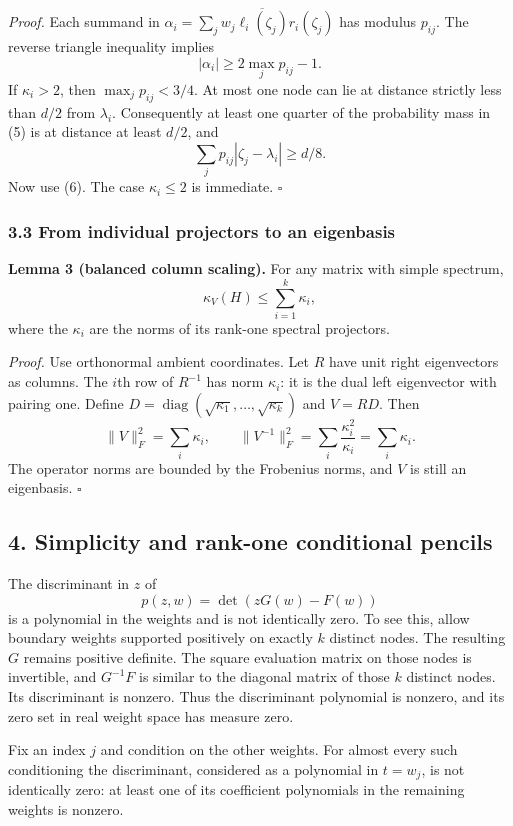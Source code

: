 \documentclass[
  11pt,
]{article}
\begin{document}
\emph{Proof.} Each summand in
\(\alpha_i=\sum_jw_j\overline{\ell_i(\zeta_j)}r_i(\zeta_j)\) has modulus
\(p_{ij}\). The reverse triangle inequality implies \[
|\alpha_i|\geq2\max_jp_{ij}-1.
\] If \(\kappa_i>2\), then \(\max_jp_{ij}<3/4\). At most one node can
lie at distance strictly less than \(d/2\) from \(\lambda_i\).
Consequently at least one quarter of the probability mass in (5) is at
distance at least \(d/2\), and \[
\sum_jp_{ij}|\zeta_j-\lambda_i|\geq d/8.
\] Now use (6). The case \(\kappa_i\leq2\) is immediate. \(\square\)

\subsubsection{3.3 From individual projectors to an
eigenbasis}\label{from-individual-projectors-to-an-eigenbasis}

\textbf{Lemma 3 (balanced column scaling).} For any matrix with simple
spectrum, \[
\kappa_V(H)\leq\sum_{i=1}^k\kappa_i, \tag{8}
\] where the \(\kappa_i\) are the norms of its rank-one spectral
projectors.

\emph{Proof.} Use orthonormal ambient coordinates. Let \(R\) have unit
right eigenvectors as columns. The \(i\)th row of \(R^{-1}\) has norm
\(\kappa_i\): it is the dual left eigenvector with pairing one. Define
\(D=\operatorname{diag}(\sqrt{\kappa_1},\ldots,\sqrt{\kappa_k})\) and
\(V=RD\). Then \[
\|V\|_F^2=\sum_i\kappa_i,
\qquad
\|V^{-1}\|_F^2=\sum_i\frac{\kappa_i^2}{\kappa_i}=\sum_i\kappa_i.
\] The operator norms are bounded by the Frobenius norms, and \(V\) is
still an eigenbasis. \(\square\)

\subsection{4. Simplicity and rank-one conditional
pencils}\label{simplicity-and-rank-one-conditional-pencils}

The discriminant in \(z\) of \[
p(z,w)=\det(zG(w)-F(w))
\] is a polynomial in the weights and is not identically zero. To see
this, allow boundary weights supported positively on exactly \(k\)
distinct nodes. The resulting \(G\) remains positive definite. The
square evaluation matrix on those nodes is invertible, and \(G^{-1}F\)
is similar to the diagonal matrix of those \(k\) distinct nodes. Its
discriminant is nonzero. Thus the discriminant polynomial is nonzero,
and its zero set in real weight space has measure zero.

Fix an index \(j\) and condition on the other weights. For almost every
such conditioning the discriminant, considered as a polynomial in
\(t=w_j\), is not identically zero: at least one of its coefficient
polynomials in the remaining weights is nonzero.
\end{document}
